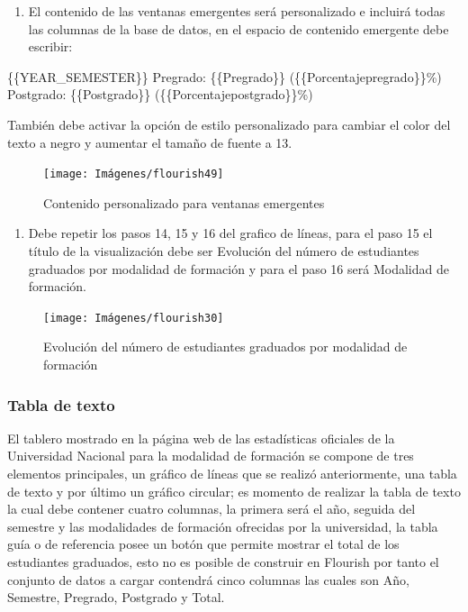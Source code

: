 \documentclass[
]{book}
\providecommand{\tightlist}{%
  \setlength{\itemsep}{0pt}\setlength{\parskip}{0pt}}
\begin{document}
\begin{enumerate}
\def\labelenumi{\arabic{enumi}.}
\setcounter{enumi}{6}
\tightlist
\item
  El contenido de las ventanas emergentes será personalizado e incluirá todas las columnas de la base de datos, en el espacio de contenido emergente debe escribir:
\end{enumerate}

\{\{YEAR\_SEMESTER\}\}
Pregrado: \{\{Pregrado\}\} (\{\{Porcentajepregrado\}\}\%)
Postgrado: \{\{Postgrado\}\} (\{\{Porcentajepostgrado\}\}\%)

También debe activar la opción de estilo personalizado para cambiar el color del texto a negro y aumentar el tamaño de fuente a 13.

\begin{figure}

{\centering \texttt{[image: Imágenes/flourish49]} 

}

\caption{Contenido personalizado para ventanas emergentes}\label{fig:paso7lineassegmentadaflourish-fig}
\end{figure}

\begin{enumerate}
\def\labelenumi{\arabic{enumi}.}
\setcounter{enumi}{7}
\tightlist
\item
  Debe repetir los pasos 14, 15 y 16 del grafico de líneas, para el paso 15 el título de la visualización debe ser Evolución del número de estudiantes graduados por modalidad de formación y para el paso 16 será Modalidad de formación.
\end{enumerate}

\begin{figure}

{\centering \texttt{[image: Imágenes/flourish30]} 

}

\caption{Evolución del número de estudiantes graduados por modalidad de formación}\label{fig:paso8lineassegmentadaflourish-fig}
\end{figure}

\hypertarget{tablatextoflourish}{%
\subsubsection{Tabla de texto}\label{tablatextoflourish}}

El tablero mostrado en la página web de las estadísticas oficiales de la Universidad Nacional para la modalidad de formación se compone de tres elementos principales, un gráfico de líneas que se realizó anteriormente, una tabla de texto y por último un gráfico circular; es momento de realizar la tabla de texto la cual debe contener cuatro columnas, la primera será el año, seguida del semestre y las modalidades de formación ofrecidas por la universidad, la tabla guía o de referencia posee un botón que permite mostrar el total de los estudiantes graduados, esto no es posible de construir en Flourish por tanto el conjunto de datos a cargar contendrá cinco columnas las cuales son Año, Semestre, Pregrado, Postgrado y Total.
\end{document}
